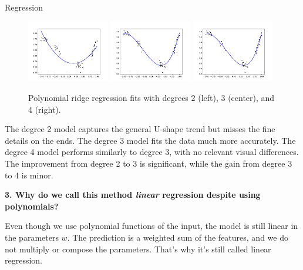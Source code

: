 \documentclass[
	english,
        solution=true
	]{tudaexercise}
\begin{document}
\begin{task}[points=34]{Regression}
\begin{subtask}[points=8, title=Polynomial Features]
\begin{solution}
            \begin{figure}[H]
                \centering
                \includegraphics[width=0.32\textwidth]{images/Task1b_2_1.png}
                \includegraphics[width=0.32\textwidth]{images/Task1b_2_2.png}
                \includegraphics[width=0.32\textwidth]{images/Task1b_2_3.png}
                \caption{Polynomial ridge regression fits with degrees 2 (left), 3 (center), and 4 (right).}
            \end{figure}

            The degree 2 model captures the general U-shape trend but misses the fine details on the ends.
            The degree 3 model fits the data much more accurately.
            The degree 4 model performs similarly to degree 3, with no relevant visual differences.
            The improvement from degree 2 to 3 is significant, while the gain from degree 3 to 4 is minor.

            \vspace{2em}

            \textbf{3. Why do we call this method \textit{linear} regression despite using polynomials?}

            Even though we use polynomial functions of the input, the model is still linear in the parameters $w$.
            The prediction is a weighted sum of the features, and we do not multiply or compose the parameters.
            That’s why it's still called linear regression.


\end{solution}
\end{subtask}
\end{task}
\end{document}
